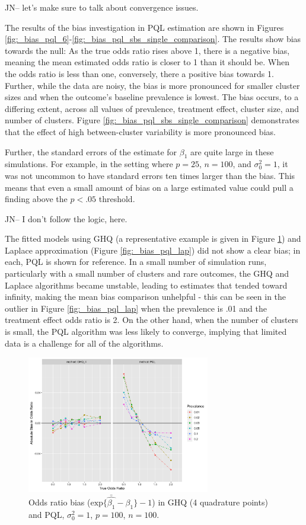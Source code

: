 \documentclass{article}
\begin{document}
\begin{flushleft}
JN-- let's make sure to talk about convergence issues.


The results of the bias investigation in PQL estimation are shown in Figures \ref{fig:_bias_pql_6}-\ref{fig:_bias_pql_sbs_single_comparison}. The results show bias towards the null: As the true odds ratio rises above 1, there is a negative bias, meaning the mean estimated odds ratio is closer to 1 than it should be. When the odds ratio is less than one, conversely, there a positive bias towards 1. Further, while the data are noisy, the bias is more pronounced for smaller cluster sizes and when the outcome's baseline prevalence is lowest. The bias occurs, to a differing extent, across all values of prevalence, treatment effect, cluster size, and number of clusters. Figure \ref{fig:_bias_pql_sbs_single_comparison} demonstrates that the effect of high between-cluster variability is more pronounced bias.

Further, the standard errors of the estimate for $\beta_1$ are quite large in these simulations. For example, in the setting where $p=25$,
$n=100$, and $\sigma_0^2=1$, it was not uncommon to have standard errors ten times larger than the bias. This means that even a small amount of bias on a large estimated value could pull a finding above the $p<.05$ threshold.

JN-- I don't follow the logic, here.

The fitted models using GHQ (a representative example is given in Figure \ref{fig:_bias_pql_ghq4}) and Laplace approximation (Figure \ref{fig:_bias_pql_lap}) did not show a clear bias; in each, PQL is shown for reference. In a small number of simulation runs, particularly with a small number of clusters and rare outcomes, the GHQ and Laplace algorithms became unstable, leading to estimates that tended toward infinity, making the mean bias comparison unhelpful - this can be seen in the outlier in Figure \ref{fig:_bias_pql_lap} when the prevalence is .01 and the treatment effect odds ratio is 2. On the other hand, when the number of clusters is small, the PQL algorithm was less likely to converge, implying that limited data is a challenge for all of the algorithms.

\begin{figure}[]
\begin{center}
\includegraphics[width=8cm]{_bias_pql_ghq4.png}
  \caption{Odds ratio bias ($\text{exp} \{ \bar{\hat{\beta_1}} - \beta_1 \} - 1$) in GHQ (4 quadrature points) and PQL, $\sigma^2_0=1$, $p=100$, $n=100$.}
  \label{fig:_bias_pql_ghq4}
\end{center}
\end{figure}


\end{flushleft}
\end{document}
